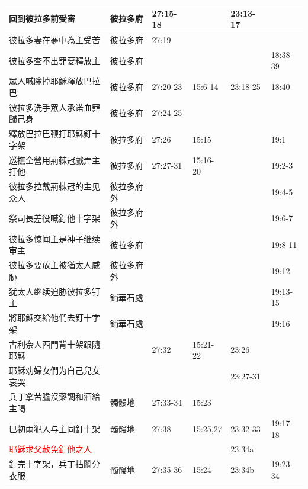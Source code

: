 \begin{table}[H]
\begin{tabular}{p{14em}|p{7.93em}|l|l|l|p{4.855em}}
回到彼拉多前受審&彼拉多府&27:15-18&       &23:13-17&  \\\midrule
彼拉多妻在夢中為主受苦&彼拉多府&27:19&       &&  \\\midrule
彼拉多查不出罪要釋放主&彼拉多府&&       &&18:38-39\\\midrule
眾人喊除掉耶穌釋放巴拉巴&彼拉多府&27:20-23&15:6-14 &23:18-25&18:40\\\midrule

彼拉多洗手眾人承诺血罪歸己身&彼拉多府&27:24-25&       &&  \\\midrule
釋放巴拉巴鞭打耶穌釘十字架&彼拉多府&27:26& 15:15 &&19:1 \\\midrule
巡撫全營用荊棘冠戲弄主打他&彼拉多府&27:27-31&15:16-20&&19:2-3\\\midrule

彼拉多拉戴荊棘冠的主见众人&彼拉多府外&       &       &&19:4-5\\\midrule
祭司長差役喊釘他十字架&彼拉多府外&       &       &&19:6-7\\\midrule
彼拉多惊闻主是神子继续审主&彼拉多府&       &       &&19:8-11\\\midrule
彼拉多要放主被猶太人威胁&彼拉多府外&       &       &&19:12\\\midrule
犹太人继续迫胁彼拉多钉主&鋪華石處&       &       &&19:13-15\\\midrule
將耶穌交給他們去釘十字架&鋪華石處&       &       &&19:16\\\midrule

古利奈人西門背十架跟隨耶穌&       &27:32&15:21-22 &23:26&  \\\midrule
耶穌劝婦女們为自己兒女哀哭&       &       &       &23:27-31&  \\\midrule

兵丁拿苦膽沒藥調和酒給主喝&髑髏地&27:33-34&15:23 &&  \\\midrule

巳初兩犯人与主同釘十架&髑髏地&27:38&15:25,27&23:32-33&19:17-18\\\midrule
\textcolor{red}{耶稣求父赦免釘他之人}&       &   &      &23:34a&  \\\midrule
釘完十字架，兵丁拈鬮分衣服&髑髏地&27:35-36&15:24&23:34b&19:23-34\\\midrule

\end{tabular}%
\end{table}


